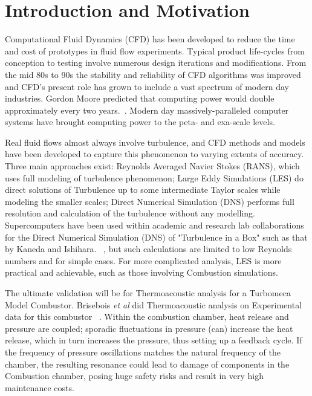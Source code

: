 \section{Introduction and Motivation}

Computational Fluid Dynamics (CFD) has been developed to reduce the time and cost of prototypes in fluid flow experiments. Typical product life-cycles from conception to testing involve numerous design iterations and modifications. From the mid 80s to 90s the stability and reliability of CFD algorithms was improved and CFD's present role has grown to include a vast spectrum of modern day industries. Gordon Moore predicted that computing power would double approximately every two years.~\cite{intel:2005}. Modern day massively-paralleled computer systems have brought computing power to the peta- and exa-scale levels.\par

Real fluid flows almost always involve turbulence, and CFD methods and models have been developed to capture this phenomenon to varying extents of accuracy. Three main approaches exist: Reynolds Averaged Navier Stokes (RANS), which uses full modeling of turbulence phenomenon; Large Eddy Simulations (LES) do direct solutions of Turbulence up to some intermediate Taylor scales while modeling the smaller scales; Direct Numerical Simulation (DNS) performs full resolution and calculation of the turbulence without any modelling. Supercomputers have been used within academic and research lab collaborations for the Direct Numerical Simulation (DNS) of "Turbulence in a Box" such as that by Kaneda and Ishihara. ~\cite{kaneda:2006}, but such calculations are limited to low Reynolds numbers and for simple cases. For more complicated analysis, LES is more practical and achievable, such as those involving Combustion simulations.\par 

The ultimate validation will be for Thermoacoustic analysis  for a Turbomeca Model Combustor. Brisebois \textit{et al} did Thermoacoustic analysis on Experimental data for this combustor ~\cite{Brisebois:2014}. Within the combustion chamber, heat release and pressure are coupled; sporadic fluctuations in pressure (can) increase the heat release, which in turn increases the pressure, thus setting up a feedback cycle. If the frequency of pressure oscillations matches the natural frequency of the chamber, the resulting resonance could lead to damage of components in the Combustion chamber, posing huge safety risks and result in very high maintenance costs.\par

